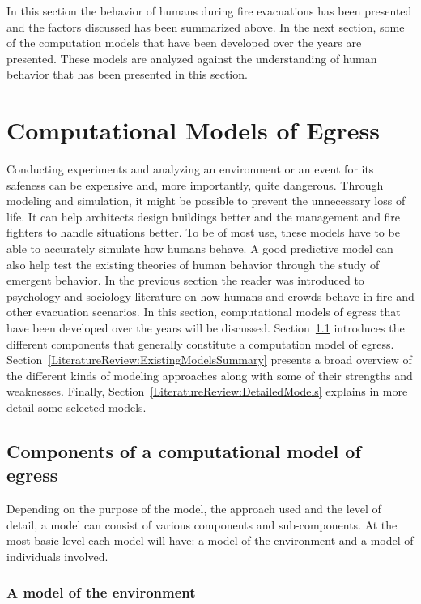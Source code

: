 In this section the behavior of humans during fire evacuations has been presented and the factors discussed has been summarized above. In the next section, some of the computation models that have been developed over the years are presented. These models are analyzed against the understanding of human behavior that has been presented in this section.

\section{Computational Models of Egress}
\label{LiteratureReview:EngineeringModels}

Conducting experiments and analyzing an environment or an event for its safeness can be expensive and, more importantly, quite dangerous. Through modeling and simulation,  it might be possible to prevent the unnecessary loss of life. It can help architects design buildings better and the management and fire fighters to handle situations better. To be of most use, these models have to be able to accurately simulate how humans behave. A good predictive model can also help test the existing theories of human behavior through the study of emergent behavior. In the previous section the reader was introduced to psychology and sociology literature on how humans and crowds behave in fire and other evacuation scenarios. In this section, computational models of egress that have been developed over the years will be discussed. Section~\ref{LiteratureReview:ComponentsOfAModel} introduces the different components that generally constitute a computation model of egress. Section~\ref{LiteratureReview:ExistingModelsSummary} presents a broad overview of the different kinds of modeling approaches along with some of their strengths and weaknesses. Finally, Section~\ref{LiteratureReview:DetailedModels} explains in more detail some selected models.

\subsection{Components of a computational model of egress}
\label{LiteratureReview:ComponentsOfAModel}

Depending on the purpose of the model, the approach used and the level of detail, a model can consist of various components and sub-components. At the most basic level each model will have: a model of the environment and a model of individuals involved.

\subsubsection{A model of the environment}

